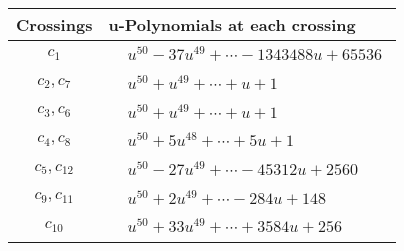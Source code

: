 \documentclass[1p]{elsarticle_modified}
\theoremstyle{definition}
\begin{document}
\begin{tabular}{m{50pt}|m{274pt}}
Crossings & \hspace{64pt}u-Polynomials at each crossing \\
\hline $$\begin{aligned}c_{1}\end{aligned}$$&$\begin{aligned}
&u^{50}-37 u^{49}+\cdots-1343488 u+65536
\end{aligned}$\\
\hline $$\begin{aligned}c_{2},c_{7}\end{aligned}$$&$\begin{aligned}
&u^{50}+u^{49}+\cdots+u+1
\end{aligned}$\\
\hline $$\begin{aligned}c_{3},c_{6}\end{aligned}$$&$\begin{aligned}
&u^{50}+u^{49}+\cdots+u+1
\end{aligned}$\\
\hline $$\begin{aligned}c_{4},c_{8}\end{aligned}$$&$\begin{aligned}
&u^{50}+5 u^{48}+\cdots+5 u+1
\end{aligned}$\\
\hline $$\begin{aligned}c_{5},c_{12}\end{aligned}$$&$\begin{aligned}
&u^{50}-27 u^{49}+\cdots-45312 u+2560
\end{aligned}$\\
\hline $$\begin{aligned}c_{9},c_{11}\end{aligned}$$&$\begin{aligned}
&u^{50}+2 u^{49}+\cdots-284 u+148
\end{aligned}$\\
\hline $$\begin{aligned}c_{10}\end{aligned}$$&$\begin{aligned}
&u^{50}+33 u^{49}+\cdots+3584 u+256
\end{aligned}$\\
\hline
\end{tabular}\\~\\
\newpage\renewcommand{\arraystretch}{1}
\end{document}
